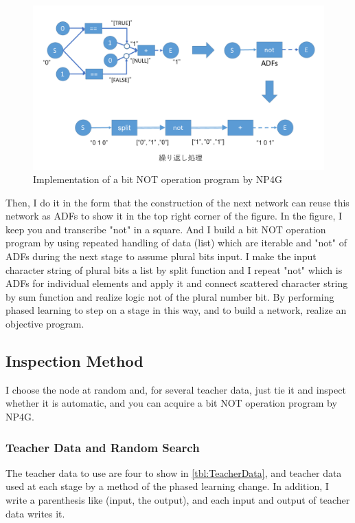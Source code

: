 \documentclass{article}
\begin{document}
\begin{figure}[t]
    \begin{center}
        \includegraphics[width=150mm]{bitwise_not.png}
    \end{center}
    \caption{Implementation of a bit NOT operation program by NP4G}
    \label{fig:bitwise_not}
\end{figure}

Then, I do it in the form that the construction of the next network can reuse this network as ADFs to show it in the top right corner of the figure.
In the figure, I keep you and transcribe "not" in a square.
And I build a bit NOT operation program by using repeated handling of data (list) which are iterable and "not" of ADFs during the next stage to assume plural bits input.
I make the input character string of plural bits a list by split function and I repeat "not" which is ADFs for individual elements and apply it and connect scattered character string by sum function and realize logic not of the plural number bit.
By performing phased learning to step on a stage in this way, and to build a network, realize an objective program.

\subsection {Inspection Method}
I choose the node at random and, for several teacher data, just tie it and inspect whether it is automatic, and you can acquire a bit NOT operation program by NP4G.

\subsubsection {Teacher Data and Random Search}
The teacher data to use are four to show in \ref{tbl:TeacherData}, and teacher data used at each stage by a method of the phased learning change.
In addition, I write a parenthesis like (input, the output), and each input and output of teacher data writes it.
\end{document}
